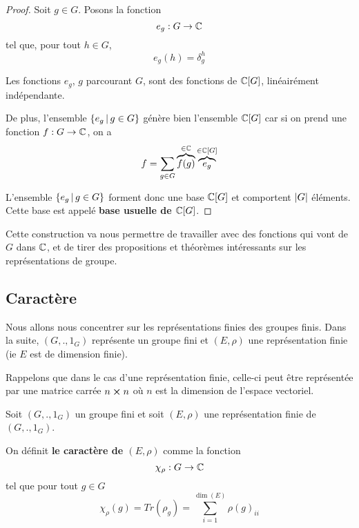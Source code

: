 \ifdefined\outputproof
\begin{proof}
	Soit $g \in G$. Posons la fonction
	\begin{equation}
		e_{g} : G \rightarrow \mathbb{C}
	\end{equation}
	tel que, pour tout $h \in G$,
	\begin{equation}
		e_{g}(h) = \delta_{g}^{h}
	\end{equation}

	Les fonctions $e_{g}$, $g$ parcourant $G$, sont des fonctions de
	$\mathbb{C}[G]$, linéairément indépendante.

	De plus, l'ensemble $\left\{e_{g} \, | \, g \in G \right\}$ génère bien l'ensemble
	$\mathbb{C}[G]$ car si on prend une fonction $f : G \rightarrow \mathbb{C}$, on
	a
	\begin{equation}
		f = \sum_{g \in G} \overbrace{f(g)}^{\in \mathbb{C}} \overbrace{e_{g}}^{\in
		\mathbb{C}[G]}
	\end{equation}

	L'ensemble $\left\{e_{g} \, | \, g \in G \right\}$ forment donc une base $\mathbb{C}[G]$
	et comportent $|G|$ éléments. Cette base est appelé \textbf{base
	usuelle de $\mathbb{C}[G]$}.
\end{proof}
\fi

Cette construction va nous permettre de travailler avec des fonctions qui vont
de $G$ dans $\mathbb{C}$, et de tirer des propositions et théorèmes intéressants
sur les représentations de groupe.

\subsection{Caractère}

Nous allons nous concentrer sur les représentations finies des groupes finis.
Dans la suite, $(G, ., 1_{G})$ représente un groupe fini et $(E, \rho)$ une
représentation finie (ie $E$ est de dimension finie).

Rappelons que dans le cas d'une représentation finie, celle-ci peut être
représentée par une matrice carrée $n \cross n$ où $n$ est la dimension de
l'espace vectoriel.

\begin{definition}
	Soit $(G, ., 1_{G})$ un groupe fini et soit $(E, \rho)$ une
	représentation finie de $(G, ., 1_{G})$.

	On définit \textbf{le caractère de $(E, \rho)$} comme la
	fonction
	\begin{equation}
		\chi_{\rho} : G \rightarrow \mathbb{C}
	\end{equation}
	tel que pour tout $g \in G$
	\begin{equation}
		\chi_{\rho}(g) = Tr(\rho_{g}) = \sum_{i = 1}^{\dim(E)} \rho(g)_{ii}
	\end{equation}
\end{definition}


